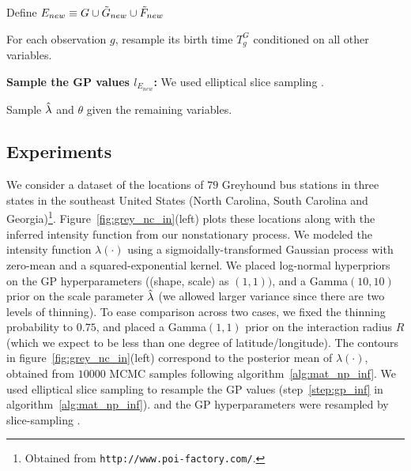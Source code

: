 \documentclass{statsoc}
\begin{document}
\begin{algorithm}
\begin{algorithmic}[1]
\State Define $E_{new} \equiv G \cup \tilde{G}_{new} \cup \tilde{F}_{new}$
\EndF
\StartMisc
\State  \begin{minipage}{\textwidth} For each \matern observation $g$, resample its birth time $T^G_g$ conditioned on all other variables.\end{minipage}
\EndMisc
\State \label{step:gp_inf}\!\textbf{Sample the GP values $l_{E_{new}}$:} 
\State \hspace{.2in} We used elliptical slice sampling \citep{murray2010}.
\State
\StartParam
\State  \begin{minipage}{\textwidth} Sample $\hat{\lambda}$ and $\theta$ given the remaining variables.\end{minipage}
\EndParam
\end{algorithmic}
\label{alg:mat_np_inf}
\end{algorithm}

  
\subsection{Experiments}

We consider a dataset of the locations of $79$ Greyhound bus stations in three states in the southeast United States (North Carolina, South Carolina and 
Georgia)\footnote{Obtained from \texttt{http://www.poi-factory.com/}.}. Figure~\ref{fig:grey_nc_in}(left) plots these locations along with the inferred intensity function
from our nonstationary \matern process. We modeled the intensity function $\lambda(\cdot)$ using a sigmoidally-transformed Gaussian process 
with zero-mean and a squared-exponential kernel. We placed log-normal hyperpriors on the 
 GP hyperparameters ((shape, scale) as $(1,1))$, and a Gamma$(10,10)$ prior on the scale parameter $\hat{\lambda}$ (we allowed larger variance since
 there are two levels of thinning).
 To ease comparison across two cases, we fixed the thinning probability to $0.75$, and placed a Gamma$(1,1)$ prior on the interaction radius $R$ (which
 we expect to be less than one degree of latitude/longitude).
The contours in figure~\ref{fig:grey_nc_in}(left) correspond to the posterior mean of $\lambda(\cdot)$, obtained from $10000$ MCMC samples 
following algorithm~\ref{alg:mat_np_inf}.
 We used elliptical slice sampling \citep{murray2010} to resample the GP values 
(step~\ref{step:gp_inf} in algorithm~\ref{alg:mat_np_inf}). and the GP hyperparameters were resampled by slice-sampling \citep{murray2010b}. 
\end{document}
